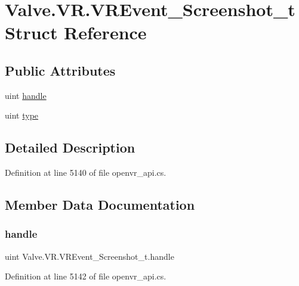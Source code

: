 \hypertarget{struct_valve_1_1_v_r_1_1_v_r_event___screenshot__t}{}\section{Valve.\+V\+R.\+V\+R\+Event\+\_\+\+Screenshot\+\_\+t Struct Reference}
\label{struct_valve_1_1_v_r_1_1_v_r_event___screenshot__t}
\subsection*{Public Attributes}
\begin{DoxyCompactItemize}
\item 
uint \mbox{\hyperlink{struct_valve_1_1_v_r_1_1_v_r_event___screenshot__t_a3ebab877ca680d62892926ff21ef7a90}{handle}}
\item 
uint \mbox{\hyperlink{struct_valve_1_1_v_r_1_1_v_r_event___screenshot__t_af6ed77a2586c54d729764bd7d876ef9a}{type}}
\end{DoxyCompactItemize}


\subsection{Detailed Description}


Definition at line 5140 of file openvr\+\_\+api.\+cs.



\subsection{Member Data Documentation}
\mbox{\label{struct_valve_1_1_v_r_1_1_v_r_event___screenshot__t_a3ebab877ca680d62892926ff21ef7a90}} 
\subsubsection{\texorpdfstring{handle}{handle}}
{\footnotesize\ttfamily uint Valve.\+V\+R.\+V\+R\+Event\+\_\+\+Screenshot\+\_\+t.\+handle}



Definition at line 5142 of file openvr\+\_\+api.\+cs.

\mbox{\label{struct_valve_1_1_v_r_1_1_v_r_event___screenshot__t_af6ed77a2586c54d729764bd7d876ef9a}} 
